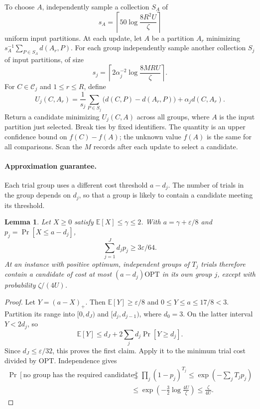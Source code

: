 \documentclass[11pt]{article}
\newtheorem{lemma}[theorem]{Lemma}
\begin{document}
To choose $A$, independently sample a collection $S_A$ of
\[
 s_A=\left\lceil50\log\frac{8R^2U}{\zeta}\right\rceil
\]
uniform input partitions. At each update, let $A$ be a partition $A_r$
minimizing $s_A^{-1}\sum_{P\in S_A}d(A_r,P)$.
For each group independently sample another collection $S_j$ of input partitions,
of size
\begin{equation}
 s_j=\left\lceil2\alpha_j^{-2}\log\frac{8MRU}{\zeta}\right\rceil.
 \label{eq:ms-pool-sample}
\end{equation}
For $C\in\mathcal C_j$ and $1\le r\le R$, define
\begin{equation}
 U_j(C,A_r)=\frac1{s_j}\sum_{P\in S_j}
               \bigl(d(C,P)-d(A_r,P)\bigr)+\alpha_jd(C,A_r).
 \label{eq:ms-upper-score}
\end{equation}
Return a candidate minimizing $U_j(C,A)$ across all groups, where $A$
is the input partition just selected. Break ties by fixed identifiers. The
quantity is an upper confidence bound on $f(C)-f(A)$; the unknown value
$f(A)$ is the same for all comparisons. Scan the $M$ records after each update to select a candidate.

\paragraph{Approximation guarantee.}

Each trial group uses a different cost threshold $a-d_j$. The number
of trials in the group depends on $d_j$, so that a group is likely to
contain a candidate meeting its threshold.

\begin{lemma}
\label{lem:ms-tail}
Let $X\ge0$ satisfy $\mathbb E[X]\le\gamma\le2$.  With
$a=\gamma+\varepsilon/8$ and $p_j=\Pr[X\le a-d_j]$,
\[
 \sum_{j=1}^Jd_jp_j\ge3\varepsilon/64.
\]
At an instance with positive optimum, independent groups of $T_j$
trials therefore contain a candidate of cost at most
$(a-d_j)\mathrm{OPT}$ in its own group $j$, except with probability
$\zeta/(4U)$.
\end{lemma}
\begin{proof}
Let $Y=(a-X)_+$.  Then $\mathbb E[Y]\ge\varepsilon/8$ and
$0\le Y\le a\le17/8<3$.  Partition its range into $[0,d_J)$ and
$[d_j,d_{j-1})$, where $d_0=3$.  On the latter interval $Y<2d_j$,
so
\[
 \mathbb E[Y]\le d_J+2\sum_jd_j\Pr[Y\ge d_j].
\]
Since $d_J\le\varepsilon/32$, this proves the first claim.
Apply it to the minimum trial cost divided by $\mathrm{OPT}$.
Independence gives
\begin{align*}
 \Pr[\text{no group has the required candidate}]
 &\le\prod_j(1-p_j)^{T_j}
 \le\exp\!\left(-\sum_jT_jp_j\right)\\
 &\le\exp\!\left(-\frac32\log\frac{4U}{\zeta}\right)
 \le\frac{\zeta}{4U}.
\end{align*}
\end{proof}
\end{document}
